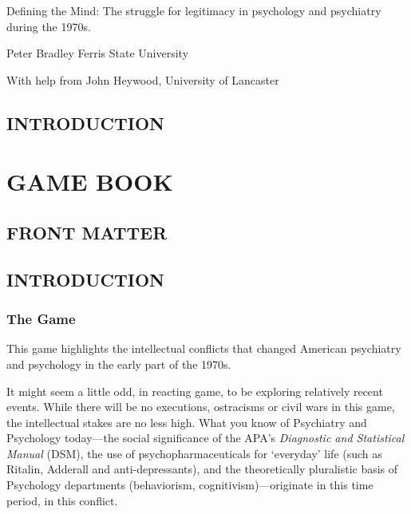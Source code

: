 \maketitle

\frontmatter{}\pagestyle{empty}



Defining the Mind:
The struggle for legitimacy in psychology and psychiatry during the 1970s.

Peter Bradley
Ferris State University

With help from
John Heywood, University of Lancaster

\tableofcontents
\listoftables
\listoffigures
\newpage


\pagebreak 

\chapter{INTRODUCTION}
\label{introduction}


\pagebreak 

\part{GAME BOOK}
\label{gamebook}

\chapter{FRONT MATTER}
\label{frontmatter}



\chapter{INTRODUCTION}
\label{introduction}

\mainmatter

\section{The Game}
\label{thegame}

This game highlights the intellectual conflicts that changed American psychiatry and psychology in the early part of the 1970s.

It might seem a little odd, in reacting game, to be exploring relatively recent events. While there will be no executions, ostracisms or civil wars in this game, the intellectual stakes are no less high. What you know of Psychiatry and Psychology today—the social significance of the APA's \emph{Diagnostic and Statistical Manual }(DSM), the use of psychopharmaceuticals for `everyday' life (such as Ritalin, Adderall and anti-depressants), and the theoretically pluralistic basis of Psychology departments (behaviorism, cognitivism)—originate in this time period, in this conflict. 

